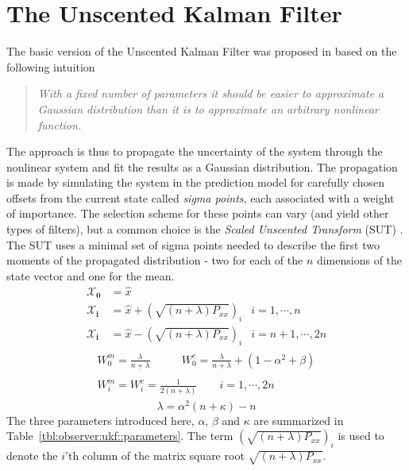 \section{The Unscented Kalman Filter}
\label{sec:observer:ukf}
    The basic version of the Unscented Kalman Filter was proposed in \citep{Julier95anewapproach}
    based on the following intuition \citep{Julier95anewapproach}
    \begin{quote}\textit{
        With a fixed number of parameters it should be easier to approximate a Gaussian
        distribution than it is to approximate an arbitrary nonlinear function.
        }
    \end{quote}
    The approach is thus to propagate the uncertainty of the system
    through the nonlinear system and fit the results as a Gaussian distribution.
    The propagation is made by simulating the system in the prediction
    model for carefully chosen offsets from the current state called
    \textit{sigma points}, each associated with a weight of importance.
    The selection scheme for these points can vary (and yield other
    types of filters), but a common choice
    is the \textit{Scaled Unscented Transform} (SUT) \citep{vandermerwe:upf}.
    The SUT uses a minimal set of sigma points needed to describe the
    first two moments of the propagated distribution - two for each
    of the $n$ dimensions of the state vector and one for the mean.
    \begin{align}\nonumber
        \mathbf{\mathcal{X}_{0}} &= \hat{x} & \\\nonumber
        \mathbf{\mathcal{X}_{i}} &= \hat{x} + \left( \sqrt{(n + \lambda) P_{xx}} \right)_{i}
            & i = 1,\cdots,n \\
        \mathbf{\mathcal{X}_{i}} &= \hat{x} - \left( \sqrt{(n + \lambda) P_{xx}} \right)_{i}
            & i = n+1,\cdots,2n
    \end{align}
    \begin{align}\nonumber
        \begin{array}{lr}
        W_{0}^{m} = \frac{\lambda}{n + \lambda} \qquad&
            W_{0}^{c} = \frac{\lambda}{n + \lambda} + (1-\alpha^{2} + \beta){}
        \end{array}\\
        \begin{array}{c}
            W^{m}_{i} =  W^{c}_{i} = \frac{1}{2(n + \lambda)} \qquad i = 1,\cdots,2n{}
        \end{array}
    \end{align}
    \begin{equation}
        \lambda = \alpha^{2}(n + \kappa) - n
    \end{equation}
    The three parameters introduced here, $\alpha$, $\beta$ and $\kappa$
    are summarized in Table~\ref{tbl:observer:ukf::parameters}.
    The term $\left( \sqrt{(n + \lambda) P_{xx}} \right)_{i}$ is used to
    denote the $i$'th column of the matrix square root $\sqrt{(n + \lambda) P_{xx}}$.


